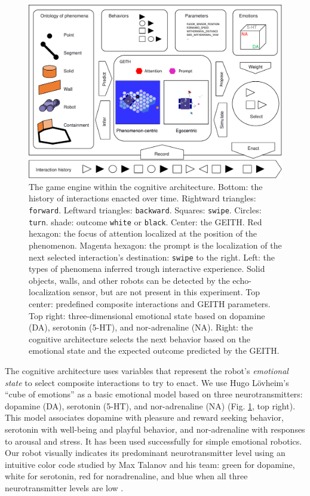 \documentclass[runningheads]{llncs}
\begin{document}
\begin{figure}
	\includegraphics[width=\textwidth]{Figure_geith.pdf}
	\caption{The game engine within the cognitive architecture.
		Bottom: the history of interactions enacted over time.
		Rightward triangles: \texttt{forward}. Leftward triangles: \texttt{backward}. Squares: \texttt{swipe}. Circles: \texttt{turn}. shade: outcome \texttt{white} or \texttt{black}.
		Center: the GEITH.
		Red hexagon: the focus of attention localized at the position of the phenomenon. 
		Magenta hexagon: the prompt is the localization of the next selected interaction's destination: \texttt{swipe} to the right.
		Left: the types of phenomena inferred trough interactive experience.
		Solid objects, walls, and other robots can be detected by the echo-localization sensor, but are not present in this experiment.
		Top center: predefined composite interactions and GEITH parameters.
		Top right: three-dimensional emotional state based on dopamine (DA), serotonin (5-HT), and nor-adrenaline (NA).
		Right: the cognitive architecture selects the next behavior based on the emotional state and the expected outcome predicted by the GEITH.} \label{fig:geith}
\end{figure}

The cognitive architecture uses variables that represent the robot's \textit{emotional state} to select composite interactions to try to enact.
We use Hugo Lövheim's ``cube of emotions'' \cite{lovheim_new_2012} as a basic emotional model based on three neurotransmitters: dopamine (DA), serotonin (5-HT), and nor-adrenaline (NA) (Fig. \ref{fig:geith}, top right).
This model associates dopamine with pleasure and reward seeking behavior, serotonin with well-being and playful behavior, and nor-adrenaline with responses to arousal and stress.
It has been used successfully for simple emotional robotics.
Our robot visually indicates its predominant neurotransmitter level using an intuitive color code studied by Max Talanov and his team: green for dopamine, white for serotonin, red for noradrenaline, and blue when all three neurotransmitter levels are low \cite{chebotareva_emotional_2019}.
\end{document}
